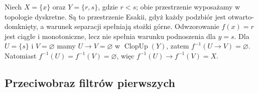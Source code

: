 \begin{przyklad}
\label{ex:ncl-heyting-esakia-nonbounded}
Niech $X=\{x\}$ oraz $Y=\{r,s\}$, gdzie $r<s$;
obie przestrzenie wyposażamy w topologie dyskretne.
Są to przestrzenie Esakii, gdyż każdy podzbiór
jest otwarto-domknięty, a warunek separacji
spełniają stożki górne.
Odwzorowanie $f(x)=r$ jest ciągłe i monotoniczne,
lecz nie spełnia warunku podnoszenia dla $y=s$.
Dla $U=\{s\}$ i $V=\varnothing$ mamy
$U\to V=\varnothing$ w $\operatorname{ClopUp}(Y)$,
zatem $f^{-1}(U\to V)=\varnothing$.
Natomiast $f^{-1}(U)=f^{-1}(V)=\varnothing$,
więc $f^{-1}(U)\to f^{-1}(V)=X$.
\end{przyklad}
\begin{center}
\end{center}

\subsection{Przeciwobraz filtrów pierwszych}

